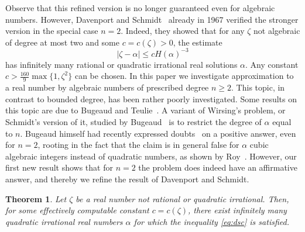 \documentclass[12pt]{amsart}
\newtheorem{theorem}{Theorem}[section]
\theoremstyle{definition}
\begin{document}
Observe that this refined version is no
longer guaranteed even for algebraic numbers.
However, Davenport and Schmidt~\cite{davs} already in 1967 
verified the stronger version
in the special case $n=2$. Indeed, they showed 
that for any $\zeta$ not algebraic of degree at most two
and some $c=c(\zeta)>0$, the estimate
%
\begin{equation} \label{eq:dsc}
\vert \zeta-\alpha\vert \leq cH(\alpha)^{-3}
\end{equation}
% 
has infinitely many rational or quadratic irrational real 
solutions $\alpha$. Any constant 
$c>\frac{160}{9}\max\{ 1,\zeta^{2}\}$ can be chosen.
In this paper we investigate approximation to a real number
by algebraic numbers of prescribed degree $n\geq 2$. This topic, in contrast to bounded degree,
has been rather poorly investigated.
Some results on this topic are due to 
Bugeaud and Teulie~\cite{bugbuch, teu, teuallein}. 
A variant of Wirsing's problem, or Schmidt's version of it, 
studied by Bugeaud~\cite[Problem~23, Section~10.2]{bugbuch}
is to restrict the degree of $\alpha$ equal to $n$.
Bugeaud himself had recently expressed 
doubts~\cite[Problem~2.9.2]{bdraft} on a positive answer, 
even for $n=2$, rooting in the fact that
the claim is in general false for $\alpha$ cubic algebraic integers
instead of quadratic numbers, as shown by Roy~\cite{roy2, roy}. However,
our first new result shows that for $n=2$ the problem does indeed
have an affirmative answer, and thereby we refine the result of Davenport and Schmidt. 


\begin{theorem} \label{bugpro}
Let $\zeta$ be a real number not rational or quadratic irrational. Then, for
some effectively computable constant $c=c(\zeta)$, there exist infinitely many quadratic irrational real numbers $\alpha$
for which the inequality \eqref{eq:dsc} is satisfied.
\end{theorem}
\end{document}
